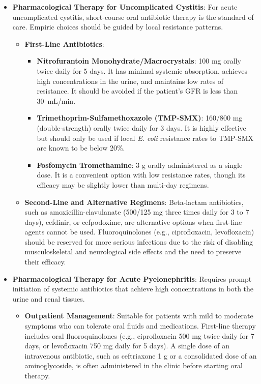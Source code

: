 \begin{itemize}
    \item \textbf{Pharmacological Therapy for Uncomplicated Cystitis}: For acute uncomplicated cystitis, short-course oral antibiotic therapy is the standard of care. Empiric choices should be guided by local resistance patterns.
    \begin{itemize}
        \item \textbf{First-Line Antibiotics}:
        \begin{itemize}
            \item \textbf{Nitrofurantoin Monohydrate/Macrocrystals}: 100 mg orally twice daily for 5 days. It has minimal systemic absorption, achieves high concentrations in the urine, and maintains low rates of resistance. It should be avoided if the patient's GFR is less than 30~mL/min.
            \item \textbf{Trimethoprim-Sulfamethoxazole (TMP-SMX)}: 160/800 mg (double-strength) orally twice daily for 3 days. It is highly effective but should only be used if local \textit{E. coli} resistance rates to TMP-SMX are known to be below 20\%.
            \item \textbf{Fosfomycin Tromethamine}: 3 g orally administered as a single dose. It is a convenient option with low resistance rates, though its efficacy may be slightly lower than multi-day regimens.
        \end{itemize}
        \item \textbf{Second-Line and Alternative Regimens}: Beta-lactam antibiotics, such as amoxicillin-clavulanate (500/125 mg three times daily for 3 to 7 days), cefdinir, or cefpodoxime, are alternative options when first-line agents cannot be used. Fluoroquinolones (e.g., ciprofloxacin, levofloxacin) should be reserved for more serious infections due to the risk of disabling musculoskeletal and neurological side effects and the need to preserve their efficacy.
    \end{itemize}
    \item \textbf{Pharmacological Therapy for Acute Pyelonephritis}: Requires prompt initiation of systemic antibiotics that achieve high concentrations in both the urine and renal tissues.
    \begin{itemize}
        \item \textbf{Outpatient Management}: Suitable for patients with mild to moderate symptoms who can tolerate oral fluids and medications. First-line therapy includes oral fluoroquinolones (e.g., ciprofloxacin 500 mg twice daily for 7 days, or levofloxacin 750 mg daily for 5 days). A single dose of an intravenous antibiotic, such as ceftriaxone 1 g or a consolidated dose of an aminoglycoside, is often administered in the clinic before starting oral therapy.

\end{itemize}
\end{itemize}

